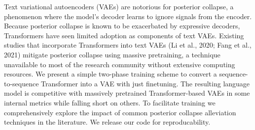 Text variational autoencoders (VAEs) are notorious for posterior collapse, a phenomenon where the model's decoder learns to ignore signals from the encoder. Because posterior collapse is known to be exacerbated by expressive decoders, Transformers have seen limited adoption as components of text VAEs. Existing studies that incorporate Transformers into text VAEs (Li et al., 2020; Fang et al., 2021) mitigate posterior collapse using massive pretraining, a technique unavailable to most of the research community without extensive computing resources. We present a simple two-phase training scheme to convert a sequence-to-sequence Transformer into a VAE with just finetuning. The resulting language model is competitive with massively pretrained Transformer-based VAEs in some internal metrics while falling short on others. To facilitate training we comprehensively explore the impact of common posterior collapse alleviation techniques in the literature. We release our code for reproducability.
